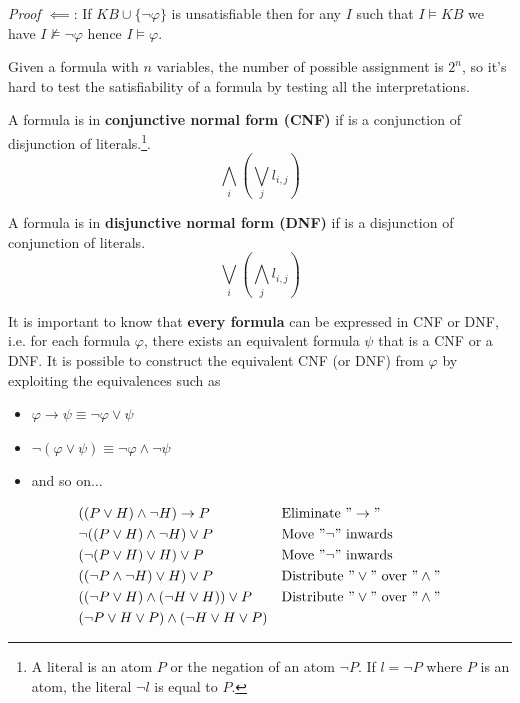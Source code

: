 \documentclass[10pt, letterpaper]{report}
\begin{document}
\noindent\textit{Proof $\impliedby$}: If $KB\cup\{\lnot \varphi\}$ is unsatisfiable then for any $I$ such that $I\models KB$ we have $I\not\models\lnot\varphi$ hence $I\models\varphi$.\bigskip 

Given a formula with $n$ variables, the number of possible assignment is $2^n$, so it's hard to test the satisfiability of a formula by testing all the  interpretations.\begin{definition}
    A formula is in \textbf{conjunctive normal form (CNF)} if is a conjunction of disjunction of literals.\footnote{A literal is an atom $P$ or the negation of an atom $\lnot P$.
    If $l=\lnot P$ where $P$ is an atom, the literal $\lnot l$ is equal to $P$.
    }.\begin{equation}
        \bigwedge_i\left(\bigvee_j l_{i,j}\right)
    \end{equation}
\end{definition}
\begin{definition}
    A formula is in \textbf{disjunctive normal form (DNF)} if is a disjunction of conjunction of literals.\begin{equation}
        \bigvee_i\left(\bigwedge_j l_{i,j}\right)
    \end{equation}
\end{definition}
It is important to know that \textbf{every formula} can be expressed in CNF or DNF, i.e. for each formula $\varphi$, there exists an equivalent formula $\psi$ that is a CNF or a DNF. It is possible to construct the equivalent CNF (or DNF) from $\varphi$ by exploiting the equivalences such as\begin{itemize}
    \item $\varphi \rightarrow \psi\equiv \lnot\varphi\lor\psi$
    \item $\lnot(\varphi\lor \psi)\equiv \lnot \varphi\land \lnot \psi$
    \item and so on...
\end{itemize}
$$\begin{aligned}
& ((P \lor H) \land \neg H) \to P && \text{Eliminate } "\to" \\
& \neg ((P \lor H) \land \neg H) \lor P && \text{Move } "\neg" \text{ inwards} \\
& (\neg (P \lor H) \lor H) \lor P && \text{Move } "\neg" \text{ inwards} \\
& ((\neg P \land \neg H) \lor H) \lor P && \text{Distribute } "\lor" \text{ over } "\land" \\
& ((\neg P \lor H) \land (\neg H \lor H)) \lor P && \text{Distribute } "\lor" \text{ over } "\land" \\
& (\neg P \lor H \lor P) \land (\neg H \lor H \lor P)
\end{aligned}$$
\end{document}
